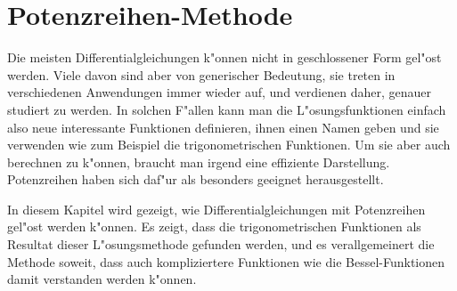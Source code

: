 %
%
%
\chapter{Potenzreihen-Methode\label{chapter:potenzreihen}}
\rhead{}
Die meisten Differentialgleichungen k"onnen nicht in geschlossener
Form gel"ost werden.
Viele davon sind aber von generischer Bedeutung, sie treten
in verschiedenen Anwendungen immer wieder auf, und verdienen daher,
genauer studiert zu werden.
In solchen F"allen kann man die L"osungsfunktionen einfach also
neue interessante Funktionen definieren, ihnen einen Namen geben
und sie verwenden wie zum Beispiel die trigonometrischen Funktionen.
Um sie aber auch berechnen zu k"onnen, braucht man irgend eine 
effiziente Darstellung.
Potenzreihen haben sich daf"ur als besonders geeignet herausgestellt.

In diesem Kapitel wird gezeigt, wie Differentialgleichungen mit Potenzreihen
gel"ost werden k"onnen.
Es zeigt, dass die trigonometrischen Funktionen als Resultat
dieser L"osungsmethode gefunden werden, und es verallgemeinert die
Methode soweit, dass auch kompliziertere Funktionen wie die
Bessel-Funktionen damit verstanden werden k"onnen.

